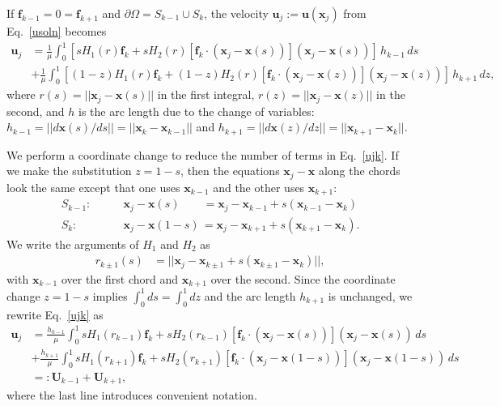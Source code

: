 \documentclass[12pt]{article}
\newcommand{\bx}{\mathbf{x}}
\newcommand{\bu}{\mathbf{u}}
\newcommand{\ff}{\mathbf{f}}
\newcommand{\bU}{\mathbf{U}}
\newcommand{\baa}[1]{\begin{align} #1 \end{align}}
\newcommand{\baas}[1]{\begin{align*} #1 \end{align*}}
\begin{document}
	If $\ff_{k-1} = 0 = \ff_{k+1}$ and $\partial\Omega = S_{k-1} \cup S_k$, the velocity $\bu_j := \bu(\bx_j)$ from Eq.~\eqref{usoln} becomes
	\baa{
	\bu_j &= \frac{1}{\mu} \int_0^1 \left[sH_1(r)\ff_k + sH_2(r)[\ff_k \cdot (\bx_j - \bx(s))](\bx_j - \bx(s))\right]\, h_{k-1} \,ds \nonumber \\
	&+ \frac{1}{\mu} \int_0^1 \left[(1-z)H_1(r)\ff_k + (1-z)H_2(r)[\ff_k \cdot (\bx_j - \bx(z))](\bx_j - \bx(z))\right]\, h_{k+1} \,dz, \label{ujk}
	}
	where $r(s) =|| \bx_j - \bx(s) ||$ in the first integral, $r(z) = || \bx_j - \bx(z) ||$ in the second, and $h$ is the arc length due to the change of variables: $h_{k-1} = || d\bx(s)/ds || = || \bx_k - \bx_{k-1}||$ and $h_{k+1} = || d\bx(z)/dz || = || \bx_{k+1} - \bx_{k}||$. 
	
	We perform a coordinate change to reduce the number of terms in Eq.~\eqref{ujk}. If we make the substitution $z = 1-s$, then the equations $\bx_j - \bx$ along the chords look the same except that one uses $\bx_{k-1}$ and the other uses $\bx_{k+1}$:
	\baas{
	S_{k-1}: & \qquad  \bx_j - \bx(s) \qquad = \bx_j - \bx_{k-1} + s(\bx_{k-1} - \bx_k) \\
	S_{k}: & \qquad  \bx_j - \bx(1-s) \, = \bx_j - \bx_{k+1} + s(\bx_{k+1} - \bx_k). \nonumber
	}
	We write the arguments of $H_1$ and $H_2$ as 
	\baa{
	r_{k\pm 1}(s) & = || \bx_j - \bx_{k\pm 1} + s(\bx_{k\pm 1} - \bx_k)|| ,  \label{rk-1} 
	}
		with $\bx_{k-1}$ over the first chord and $\bx_{k+1}$ over the second. Since the coordinate change $z=1-s$ implies $\int_0^1 ds  = \int_0^1 dz$ and the arc length $h_{k+1}$ is unchanged, we rewrite Eq.~\eqref{ujk} as
	\baa{
	\bu_j &= \frac{h_{k-1}}{\mu} \int_0^1 sH_1(r_{k-1})\ff_k + sH_2(r_{k-1})[\ff_k \cdot (\bx_j - \bx(s))](\bx_j - \bx(s)) \,ds \nonumber \\
	&+ \frac{h_{k+1}}{\mu} \int_0^1 sH_1(r_{k+1})\ff_k + sH_2(r_{k+1})[\ff_k \cdot (\bx_j - \bx(1-s))](\bx_j - \bx(1-s)) \,ds \nonumber \\
	& =: \bU_{k-1} + \bU_{k+1}, \label{ujkcc}
	}
	where the last line introduces convenient notation.
	 	
\end{document}
